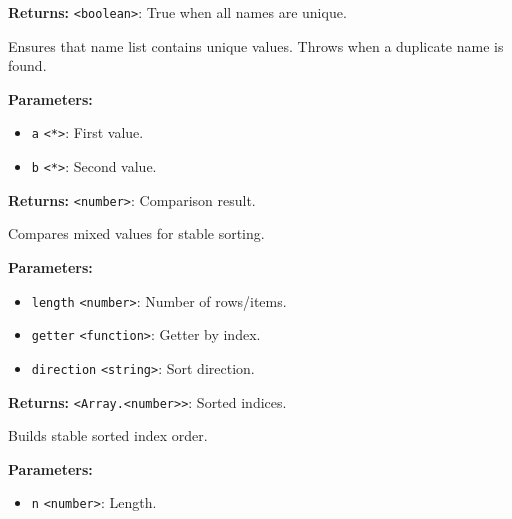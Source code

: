 \documentclass[12pt,a4paper]{article}
\begin{document}
\noindent \textbf{Returns:} \texttt{<boolean>}: True when all names are unique.

\noindent Ensures that name list contains unique values.
Throws when a duplicate name is found.

\vspace{5mm}
\noindent {}


\noindent \textbf{Parameters:}
\begin{itemize}
  \item \texttt{a} \texttt{<*>}: First value.
  \item \texttt{b} \texttt{<*>}: Second value.
\end{itemize}

\noindent \textbf{Returns:} \texttt{<number>}: Comparison result.

\noindent Compares mixed values for stable sorting.

\vspace{5mm}
\noindent {}


\noindent \textbf{Parameters:}
\begin{itemize}
  \item \texttt{length} \texttt{<number>}: Number of rows/items.
  \item \texttt{getter} \texttt{<function>}: Getter by index.
  \item \texttt{direction} \texttt{<string>}: Sort direction.
\end{itemize}

\noindent \textbf{Returns:} \texttt{<Array.<number>>}: Sorted indices.

\noindent Builds stable sorted index order.

\vspace{5mm}
\noindent {}


\noindent \textbf{Parameters:}
\begin{itemize}
  \item \texttt{n} \texttt{<number>}: Length.
\end{itemize}
\end{document}
